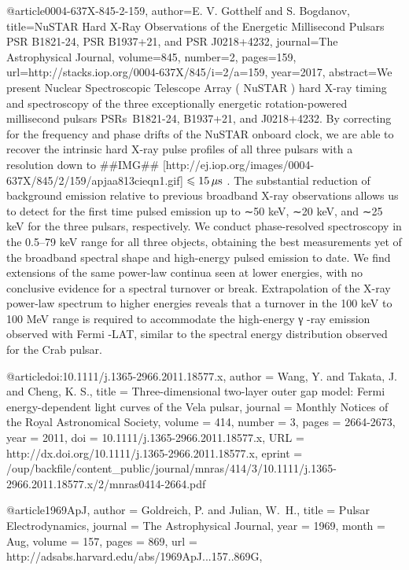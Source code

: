 {{@article{0004-637X-845-2-159,
  author={E. V. Gotthelf and S. Bogdanov},
  title={NuSTAR Hard X-Ray Observations of the Energetic Millisecond Pulsars PSR B1821-24, PSR B1937+21, and PSR J0218+4232},
  journal={The Astrophysical Journal},
  volume={845},
  number={2},
  pages={159},
  url={http://stacks.iop.org/0004-637X/845/i=2/a=159},
  year={2017},
  abstract={We present Nuclear Spectroscopic Telescope Array ( NuSTAR ) hard X-ray timing and spectroscopy of the three exceptionally energetic rotation-powered millisecond pulsars PSRs B1821-24, B1937+21, and J0218+4232. By correcting for the frequency and phase drifts of the NuSTAR onboard clock, we are able to recover the intrinsic hard X-ray pulse profiles of all three pulsars with a resolution down to ##IMG## [http://ej.iop.org/images/0004-637X/845/2/159/apjaa813cieqn1.gif] {$\leqslant 15\,\mu {\rm{s}}$} . The substantial reduction of background emission relative to previous broadband X-ray observations allows us to detect for the first time pulsed emission up to ∼50 keV, ∼20 keV, and ∼25 keV for the three pulsars, respectively. We conduct phase-resolved spectroscopy in the 0.5–79 keV range for all three objects, obtaining the best measurements yet of the broadband spectral shape and high-energy pulsed emission to date. We find extensions of the same power-law continua seen at lower energies, with no conclusive evidence for a spectral turnover or break. Extrapolation of the X-ray power-law spectrum to higher energies reveals that a turnover in the 100 keV to 100 MeV range is required to accommodate the high-energy γ -ray emission observed with Fermi -LAT, similar to the spectral energy distribution observed for the Crab pulsar.}
}

@article{doi:10.1111/j.1365-2966.2011.18577.x,
  author = {Wang, Y. and Takata, J. and Cheng, K. S.},
  title = {Three-dimensional two-layer outer gap model: Fermi energy-dependent light curves of the Vela pulsar},
  journal = {Monthly Notices of the Royal Astronomical Society},
  volume = {414},
  number = {3},
  pages = {2664-2673},
  year = {2011},
  doi = {10.1111/j.1365-2966.2011.18577.x},
  URL = {http://dx.doi.org/10.1111/j.1365-2966.2011.18577.x},
  eprint = {/oup/backfile/content_public/journal/mnras/414/3/10.1111/j.1365-2966.2011.18577.x/2/mnras0414-2664.pdf}
}
	

@article{1969ApJ,
   author = {Goldreich, P. and Julian, W.~H.},
    title = {Pulsar Electrodynamics},
  journal = {The Astrophysical Journal},
     year = {1969},
    month = {Aug},
   volume = {157},
    pages = {869},
   url = {http://adsabs.harvard.edu/abs/1969ApJ...157..869G},
}

}}
